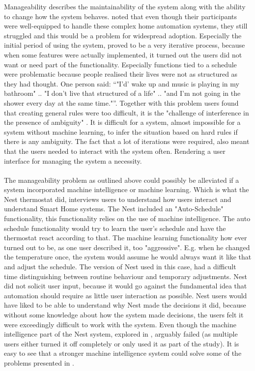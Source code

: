 Manageability describes the maintainability of the system along with the ability to change how the system behaves. \cite{HAInterviews} noted that even though their participants were well-equipped to handle these complex home automation systems, they still struggled  and this would be a problem for widespread adoption. Especially the initial period of using the system, proved to be a very iterative process, because when some features were actually implemented, it turned out the users did not want or need part of the functionality. Especially functions tied to a schedule were problematic because people realised their lives were not as structured as they had thought. One person said: \enquote{"I'd' wake up and music is playing in my bathroom" .. "I don't live that structured of a life" .. "and I'm not going in the shower every day at the same time."}. Together with this problem users found that creating general rules were too difficult, it is the "challenge of interference in the presence of ambiguity" \cite{HAInterviews}. It is difficult for a system, almost impossible for a system without machine learning, to infer the situation based on hard rules if there is any ambiguity. The fact that a lot of iterations were required, also meant that the users needed to interact  with the system often. Rendering a user interface  for managing the system a necessity.
\\\\
The manageability problem as outlined above could possibly  be alleviated if a system incorporated machine intelligence or machine learning. Which is what the Nest thermostat did, \cite{AdaptiveInterviews} interviews users to understand how users interact and understand Smart Home systems. The Nest included an "Auto-Schedule" functionality, this functionality relies on the use of machine intelligence. The auto schedule functionality would try to learn the user's schedule and have the thermostat react according to that. The machine learning functionality how ever turned out to be, as one user described it\cite{AdaptiveInterviews}, too "aggressive". E.g. when he changed the temperature once, the system would assume he would always want it like that and adjust the schedule. The version of Nest used in this case, had a difficult time distinguishing between routine behaviour and temporary adjustments. Nest did not solicit  user input, because it would go against the fundamental idea that automation should require as little user interaction as possible. Nest users would have liked to be able to understand why Nest made the decisions it did, because without some knowledge about how the system made decisions, the users felt it were exceedingly difficult to work with the system.
Even though the machine intelligence part of the Nest system, explored in \cite{AdaptiveInterviews}, arguably failed (as multiple users either turned it off completely or only used it as part of the study). It is easy to see that a stronger  machine intelligence system could solve some of the problems presented in \cite{HAInterviews}. 

